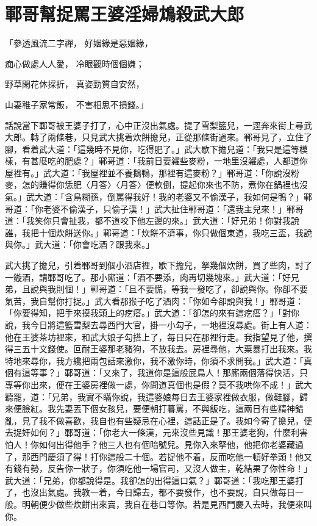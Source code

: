 %

\chapter{鄆哥幫捉罵王婆\KG 淫婦鴆殺武大郎}

「參透風流二字禪，  好姻緣是惡姻緣，

痴心做處人人愛，  冷眼觀時個個嫌；

野草閑花休採折，  真姿勁質自安然，

山妻稚子家常飯，  不害相思不損錢。」

話說當下鄆哥被王婆子打了，心中正沒出氣處。提了雪梨籃兒，一逕奔來街上尋武大郎。轉了兩條巷，只見武大挑着炊餅擔兒，正從那條街過來。鄆哥見了，立住了腳，看着武大道：「這幾時不見你，吃得肥了。」武大歇下擔兒道：「我只是這等模樣，有甚麼吃的肥處？」鄆哥道：「我前日要糴些麥粉，一地里沒糴處，人都道你屋裡有。」武大道：「我屋裡並不養鵝鴨，那裡有這麥粉？」鄆哥道：「你說沒粉麥，怎的賺得你恁肥〈月答〉〈月答〉便軟倒，提起你來也不防，煮你在鍋裡也沒氣。」武大道：「含鳥糊孫，倒罵得我好！我的老婆又不偷漢子，我如何是鴨？」鄆哥道：「你老婆不偷漢子，只偷子漢！」武大扯住鄆哥道：「還我主兒來！」鄆哥道：「我笑你只會扯我，都不道咬下他左邊的來。」武大道：「好兄弟！你對我說誰，我把十個炊餅送你。」鄆哥道：「炊餅不濟事，你只做個東道，我吃三盃，我說與你。」武大道：「你會吃酒？跟我來。」

武大挑了擔兒，引着鄆哥到個小酒店裡，歇下擔兒，拏幾個炊餅，買了些肉，討了一鏇酒，請鄆哥吃了。那小廝道：「酒不要添，肉再切幾塊來。」武大道：「好兄弟，且說與我則個！」鄆哥道：「且不要慌，等我一發吃了，卻說與你。你卻不要氣苦，我自幫你打捉。」武大看那猴子吃了酒肉：「你如今卻說與我！」鄆哥道：「你要得知，把手來摸我頭上的疙瘩。」武大道：「卻怎的來有這疙瘩？」「對你說，我今日將這籃雪梨去尋西門大官，掛一小勾子，一地裡沒尋處。街上有人道：他在王婆茶坊裡來，和武大娘子勾搭上了，每日只在那裡行走。我指望見了他，撰得三五十文錢使。叵耐王婆那老豬狗，不放我去。房裡尋他，大粟暴打出我來。我特地來尋你，我方纔把兩包話來激你，我不激你時，你須不求問我。」武大道：「真個有這等事？」鄆哥道：「又來了，我道你是這般屁鳥人！那廝兩個落得快活，只專等你出來，便在王婆房裡做一處，你問道真個也是假？莫不我哄你不成！」武大聽罷，道：「兄弟，我實不瞞你說，我這婆娘每日去王婆家裡做衣服，做鞋腳，歸來便臉紅。我先妻丟下個女孩兒，要便朝打暮罵，不與飯吃，這兩日有些精神錯亂，見了我不做喜歡，我自也有些疑忌在心裡，這話正是了。我如今寄了擔兒，便去捉奸如何？」鄆哥道：「你老大一條漢，元來沒些見識！那王婆老狗，什麼利害怕人！你如何出得他手？他三人也有個暗號兒。見你入來拏他，他把你老婆藏過了，那西門慶須了得！打你這般二十個。若捉他不着，反而吃他一頓好拳頭！他又有錢有勢，反告你一狀子，你須吃他一場官司，又沒人做主，乾結果了你性命！」武大道：「兄弟，你都說得是。我卻怎的出得這口氣？」鄆哥道：「我吃那王婆打了，也沒出氣處。我教一着，今日歸去，都不要發作，也不要說，自只做每日一般。明朝便少做些炊餅出來賣，我自在巷口等你。若是見西門慶入去時，我便來叫你。

